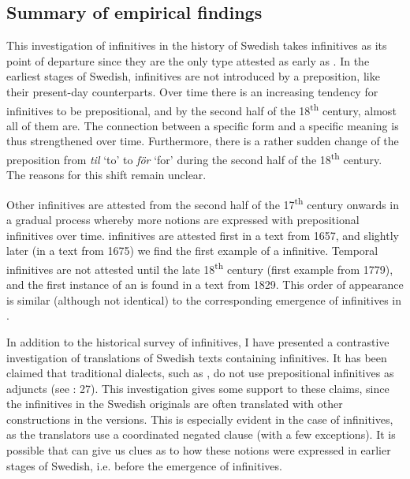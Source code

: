 \documentclass[output=paper]{langscibook}
\begin{document}
\subsection{Summary of empirical findings}\label{sec:kalm:4.4}


This investigation of  infinitives in the history of Swedish takes  infinitives as its point of departure since they are the only type attested as early as . In the earliest stages of Swedish,  infinitives are not introduced by a preposition, like their present-day counterparts. Over time there is an increasing tendency for  infinitives to be prepositional, and by the second half of the 18\textsuperscript{th} century, almost all of them are. The connection between a specific form and a specific meaning is thus strengthened over time. Furthermore, there is a rather sudden change of the  preposition from \textit{til} ‘to’ to \textit{för} ‘for’ during the second half of the 18\textsuperscript{th} century. The reasons for this shift remain unclear. 



Other  infinitives are attested from the second half of the 17\textsuperscript{th} century onwards in a gradual process whereby more  notions are expressed with prepositional infinitives over time.  infinitives are attested first in a text from 1657, and slightly later (in a text from 1675) we find the first example of a  infinitive. Temporal infinitives are not attested until the late 18\textsuperscript{th} century (first example from 1779), and the first instance of an  is found in a text from 1829. This order of appearance is similar (although not identical) to the corresponding emergence of  infinitives in . 



In addition to the historical survey of  infinitives, I have presented a contrastive investigation of  translations of Swedish texts containing  infinitives. It has been claimed that traditional dialects, such as , do not use prepositional infinitives as  adjuncts (see \citealt{Holm1967}: 27). This investigation gives some support to these claims, since the  infinitives in the Swedish originals are often translated with other constructions in the  versions. This is especially evident in the case of  infinitives, as the translators use a coordinated negated clause (with a few exceptions). It is possible that  can give us clues as to how these  notions were expressed in earlier stages of Swedish, i.e. before the emergence of  infinitives. 
\end{document}
